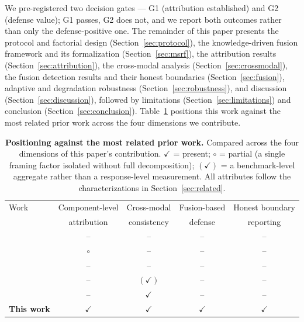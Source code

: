 We pre-registered two decision gates --- G1 (attribution established) and G2
(defense value); G1 passes, G2 does not, and we report both outcomes rather
than only the defense-positive one. The remainder of this paper presents the
protocol and factorial design (Section~\ref{sec:protocol}), the knowledge-driven
fusion framework and its formalization (Section~\ref{sec:msrf}), the attribution
results (Section~\ref{sec:attribution}), the cross-modal analysis
(Section~\ref{sec:crossmodal}), the fusion detection results and
their honest boundaries (Section~\ref{sec:fusion}), adaptive and degradation
robustness (Section~\ref{sec:robustness}), and discussion
(Section~\ref{sec:discussion}), followed by limitations
(Section~\ref{sec:limitations}) and conclusion
(Section~\ref{sec:conclusion}). Table~\ref{tab:novelty} positions this work
against the most related prior work across the four dimensions we contribute.

\begin{table}[t]
\centering
\caption{\textbf{Positioning against the most related prior work.} Compared
across the four dimensions of this paper's contribution. $\checkmark$ =
present; $\circ$ = partial (a single framing factor isolated without full
decomposition); $(\checkmark)$ = a benchmark-level aggregate rather than a
response-level measurement. All attributes follow the characterizations in
Section~\ref{sec:related}.}
\label{tab:novelty}
\footnotesize
{\setlength{\tabcolsep}{4pt}
\begin{tabular}{lcccc}
\toprule
Work & Component-level & Cross-modal & Fusion-based & Honest boundary \\
     & attribution     & consistency  & defense      & reporting \\
\midrule
\citet{nyhm}            & -- & --       & -- & -- \\
\citet{pjbreak}         & $\circ$ & --   & -- & -- \\
\citet{stylebreak}      & -- & --       & -- & -- \\
\citet{omnisafetybench} & -- & $(\checkmark)$ & -- & -- \\
\citet{crossmodal-info} & -- & $\checkmark$ & -- & -- \\
\textbf{This work}      & $\checkmark$ & $\checkmark$ & $\checkmark$ & $\checkmark$ \\
\bottomrule
\end{tabular}}
\end{table}
